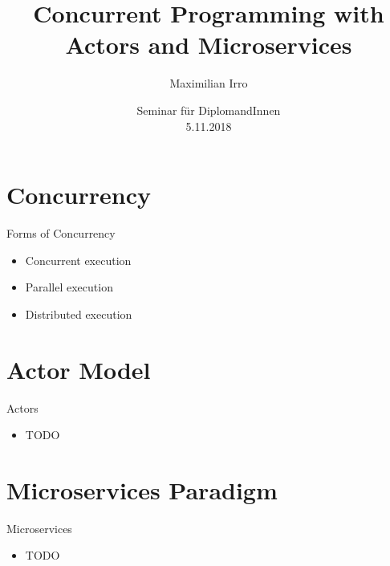 \documentclass{beamer}
\title[Your Short Title]{Concurrent Programming with\\Actors and Microservices}
\author{Maximilian Irro}
\date{Seminar für DiplomandInnen\\5.11.2018}
\begin{document}
\begin{frame}
  \titlepage
\end{frame}


\section{Concurrency}


\begin{frame}{Forms of Concurrency}

\begin{itemize}
  \item Concurrent execution
  \item Parallel execution
  \item Distributed execution
\end{itemize}

\end{frame}


\section{Actor Model}

\begin{frame}{Actors}

\begin{itemize}
  \item TODO
\end{itemize}

\end{frame}

\section{Microservices Paradigm}

\begin{frame}{Microservices}

\begin{itemize}
  \item TODO
\end{itemize}

\end{frame}
\end{document}
